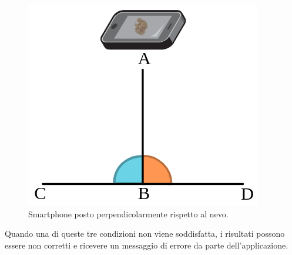 {\begin{figure}[h]
	\begin{center}
		\includegraphics[scale=0.45]{figure/capitolo7/perpendicolare.png}
	\end{center}
	\caption{Smartphone posto perpendicolarmente rispetto al nevo.}	
\end{figure}
Quando una di queste tre condizioni non viene soddisfatta, i risultati possono essere non corretti e ricevere un messaggio di errore da parte dell'applicazione.
}